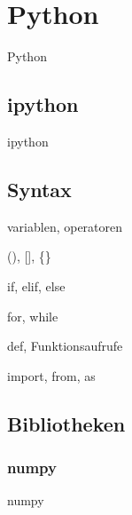 \section{Python}
  \begin{frame}{Python}
    \tableofcontents[sectionstyle=show/hide,
                     subsectionstyle=show/show/hide,
                     subsubsectionstyle=show/show/show]
  \end{frame}

  \subsection{ipython}
    \begin{frame}{ipython}
    \end{frame}
    
  \subsection{Syntax}
    \begin{frame}{variablen, operatoren}
    \end{frame}
    
    \begin{frame}{(), [], \{\}}
    \end{frame}
    
    \begin{frame}{if, elif, else}
    \end{frame}
    
    \begin{frame}{for, while}
    \end{frame}
    
    \begin{frame}{def, Funktionsaufrufe}
    \end{frame}
    
    \begin{frame}{import, from, as}
    \end{frame}
  
  \subsection{Bibliotheken}
    \subsubsection{numpy}
      \begin{frame}{numpy}
      \end{frame}
    

